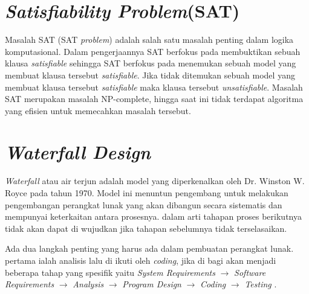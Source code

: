 \section{\textit{Satisfiability Problem}(SAT)}

Masalah SAT (SAT \textit{problem}) adalah salah satu masalah penting dalam logika komputasional\cite{huth2004logic}. Dalam pengerjaannya SAT berfokus pada membuktikan sebuah klausa \textit{satisfiable} sehingga SAT berfokus pada menemukan sebuah model yang membuat klausa tersebut \textit{satisfiable}. Jika tidak ditemukan sebuah model yang membuat klausa tersebut \textit{satisfiable} maka klausa tersebut \textit{unsatisfiable}. Masalah SAT merupakan masalah NP-complete, hingga saat ini tidak
terdapat algoritma yang efisien untuk memecahkan masalah tersebut. 

\section{\textit{Waterfall Design}}

\textit{Waterfall} atau air terjun adalah model yang diperkenalkan oleh Dr.
Winston W. Royce pada tahun 1970. Model ini menuntun pengembang untuk
melakukan pengembangan perangkat lunak yang akan dibangun secara sistematis
dan mempunyai keterkaitan antara prosesnya. dalam arti tahapan proses
berikutnya tidak akan dapat di wujudkan jika tahapan sebelumnya tidak
terselasaikan.

Ada dua langkah penting yang harus ada dalam pembuatan perangkat lunak. pertama ialah analisis lalu di ikuti oleh \textit{coding}, jika di bagi akan menjadi beberapa tahap yang spesifik yaitu \textit{System
Requirements} $\to$ \textit{Software Requirements} $\to$ \textit{Analysis} $\to$ \textit{Program Design} $\to$ \textit{Coding} $\to$ \textit{Testing} \cite{royce1987managing}. 

